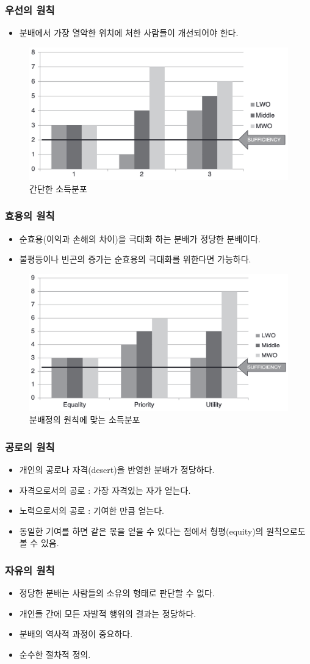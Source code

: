 \documentclass[aspectratio=169,xcolor=dvipsnames,handout]{beamer}
\begin{document}
\begin{frame}[<+->]
\frametitle{우선의 원칙}
    \begin{itemize}
        \item 분배에서 가장 열악한 위치에 처한 사람들이 개선되어야 한다.
    \end{itemize}
    \begin{figure}
        \centering
        \caption{간단한 소득분포}
        \includegraphics[width=.5\textwidth]{pic/fig1_2.png}
    \end{figure}
\end{frame}

\begin{frame}[<+->]
\frametitle{효용의 원칙}
    \begin{itemize}
        \item 순효용(이익과 손해의 차이)을 극대화 하는 분배가 정당한 분배이다.
        \item 불평등이나 빈곤의 증가는 순효용의 극대화를 위한다면 가능하다.
    \end{itemize}
    \begin{figure}
        \centering
        \caption{분배정의 원칙에 맞는 소득분포}
        \includegraphics[width=.5\textwidth]{pic/fig1_4.png}
    \end{figure}
\end{frame}

\begin{frame}[<+->]
\frametitle{공로의 원칙}
    \begin{itemize}
        \item 개인의 공로나 자격(desert)을 반영한 분배가 정당하다.
        \item 자격으로서의 공로 : 가장 자격있는 자가 얻는다.
        \item 노력으로서의 공로 : 기여한 만큼 얻는다.
        \item 동일한 기여를 하면 같은 몫을 얻을 수 있다는 점에서 형평(equity)의 원칙으로도 볼 수 있음.
    \end{itemize}
\end{frame}

\begin{frame}[<+->]
\frametitle{자유의 원칙}
    \begin{itemize}
        \item 정당한 분배는 사람들의 소유의 형태로 판단할 수 없다.
        \item 개인들 간에 모든 자발적 행위의 결과는 정당하다.
        \item 분배의 역사적 과정이 중요하다.
        \item 순수한 절차적 정의.
    \end{itemize}
\end{frame}
\end{document}
